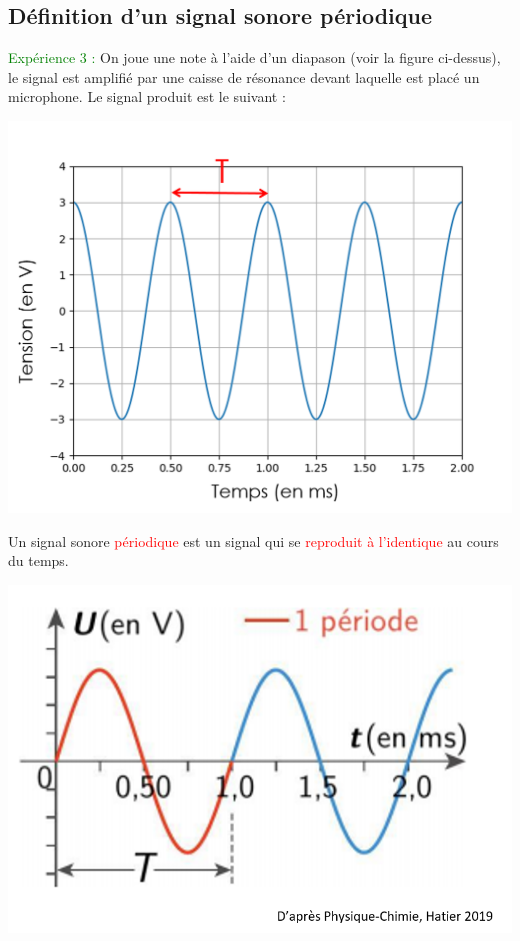 \subsection{Définition d'un signal sonore périodique}
\textcolor{green}{Expérience 3 :} On joue une note à l'aide d'un diapason (voir la figure ci-dessus), le signal est amplifié par une caisse de résonance devant laquelle est placé un microphone. Le signal produit est le suivant :
\begin{multicols}{2}
\begin{center}
    \includegraphics[scale=0.4]{Images/Signal_diapason_freq.png}
\end{center}
\begin{tcolorbox}
[colback=green!5!white,colframe=green!75!black,title=\textbf{Signal périodique :}]
Un signal sonore \textcolor{red}{périodique} est un signal qui se \textcolor{red}{reproduit à l'identique} au cours du temps.
\begin{center}
    \includegraphics[scale=0.35]{Images/Periode.PNG}
\end{center}
\end{tcolorbox}
\end{multicols}

